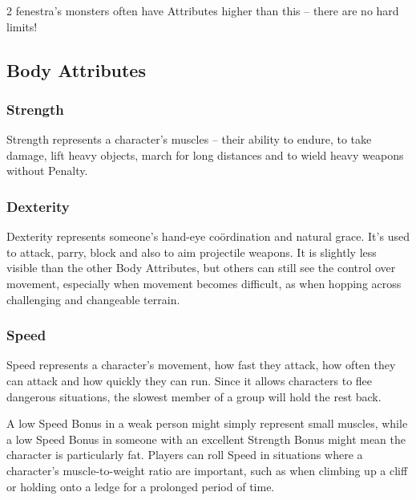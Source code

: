 \begin{multicols}{2}
\Gls{fenestra}'s \glspl{monster} often have Attributes higher than this -- there are no hard limits!

\subsection{Body Attributes}


\subsubsection[Strength]{Strength }

Strength represents a character's muscles -- their ability to endure, to take damage, lift heavy objects, march for long distances and to wield heavy weapons without Penalty.

\bigbreak

\subsubsection[Dexterity]{Dexterity }

Dexterity represents someone's hand-eye co\"ordination and natural grace.
It's used to attack, parry, block and also to aim projectile weapons.
It is slightly less visible than the other Body Attributes, but others can still see the control over movement, especially when movement becomes difficult, as when hopping across challenging and changeable terrain.

\subsubsection[Speed]{Speed }

Speed represents a character's movement, how fast they attack, how often they can attack and how quickly they can run.
Since it allows characters to flee dangerous situations, the slowest member of a group will hold the rest back.

A low Speed Bonus in a weak person might simply represent small muscles, while a low Speed Bonus in someone with an excellent Strength Bonus might mean the character is particularly fat.
Players can roll Speed in situations where a character's muscle-to-weight ratio are important, such as when climbing up a cliff or holding onto a ledge for a prolonged period of time.


\end{multicols}
